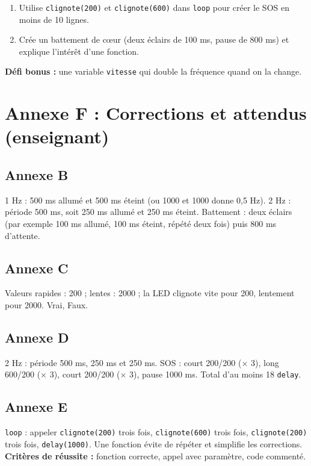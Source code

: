 \documentclass[11pt,a4paper]{article}
\begin{document}
\begin{enumerate}
 \item Utilise \texttt{clignote(200)} et \texttt{clignote(600)} dans \texttt{loop} pour créer le SOS en moins de 10 lignes.\\ \lig
 \item Crée un battement de c\oe ur (deux éclairs de 100 ms, pause de 800 ms) et explique l'intérêt d'une fonction.\\ \lig \lig
\end{enumerate}

\textbf{Défi bonus :} une variable \texttt{vitesse} qui double la fréquence quand on la change.

\newpage
\section*{Annexe F : Corrections et attendus (enseignant)}

\subsection*{Annexe B}
1 Hz : 500 ms allumé et 500 ms éteint (ou 1000 et 1000 donne 0,5 Hz). 2 Hz : période 500 ms, soit 250 ms allumé et 250 ms éteint. Battement : deux éclairs (par exemple 100 ms allumé, 100 ms éteint, répété deux fois) puis 800 ms d'attente.

\subsection*{Annexe C}
Valeurs rapides : 200 ; lentes : 2000 ; la LED clignote vite pour 200, lentement pour 2000. Vrai, Faux.

\subsection*{Annexe D}
2 Hz : période 500 ms, 250 ms et 250 ms. SOS : court 200/200 ($\times$ 3), long 600/200 ($\times$ 3), court 200/200 ($\times$ 3), pause 1000 ms. Total d'au moins 18 \texttt{delay}.

\subsection*{Annexe E}
\texttt{loop} : appeler \texttt{clignote(200)} trois fois, \texttt{clignote(600)} trois fois, \texttt{clignote(200)} trois fois, \texttt{delay(1000)}. Une fonction évite de répéter et simplifie les corrections.\\
\textbf{Critères de réussite :} fonction correcte, appel avec paramètre, code commenté.
\end{document}
